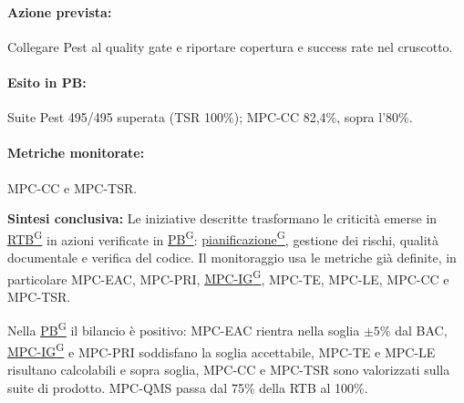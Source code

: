 \documentclass[a4paper,12pt]{article}
\providecommand{\glslink}[2]{\href{https://alittlebyte-19.github.io/Documentazione/glossario.html\#gls-#1}{\underline{#2}\textsuperscript{\scriptsize G}}}
\begin{document}
\paragraph*{Azione prevista:} Collegare Pest al quality gate e riportare copertura e success rate nel cruscotto.

\paragraph*{Esito in PB:} Suite Pest 495/495 superata (TSR 100\%); MPC-CC 82,4\%, sopra l'80\%.

\paragraph*{Metriche monitorate:} MPC-CC e MPC-TSR.

\bigskip

\noindent\textbf{Sintesi conclusiva:} Le iniziative descritte trasformano le criticità emerse in \glslink{rtb-requirements-and-technology-baseline}{RTB} in azioni verificate in \glslink{pb-product-baseline}{PB}: \glslink{pianificazione}{pianificazione}, gestione dei rischi, qualità documentale e verifica del codice. Il monitoraggio usa le metriche già definite, in particolare MPC-EAC, MPC-PRI, \glslink{indice-di-gulpease-mpc-ig}{MPC-IG}, MPC-TE, MPC-LE, MPC-CC e MPC-TSR.

Nella \glslink{pb-product-baseline}{PB} il bilancio è positivo: MPC-EAC rientra nella soglia $\pm 5\%$ dal BAC, \glslink{indice-di-gulpease-mpc-ig}{MPC-IG} e MPC-PRI soddisfano la soglia accettabile, MPC-TE e MPC-LE risultano calcolabili e sopra soglia, MPC-CC e MPC-TSR sono valorizzati sulla suite di prodotto. MPC-QMS passa dal 75\% della RTB al 100\%.
\end{document}
